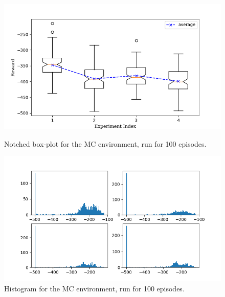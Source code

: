 \documentclass[hidelinks,journal]{IEEEtran}
\begin{document}
\begin{appendices}
\begin{figure}[!h]
  \centering
  \includegraphics[scale=1]{graph/mc1ResBox.png}
  \caption{Notched box-plot for the MC environment, run for 100 episodes.}
  \includegraphics[scale=1]{graph/mc1ResHist.png}
  \caption{Histogram for the MC environment, run for 100 episodes.}
\end{figure}

\pagebreak


\end{appendices}
\end{document}

